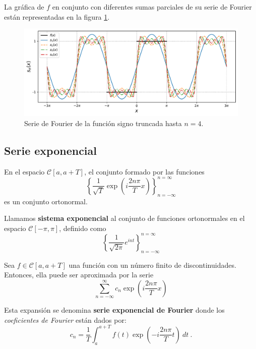 \begin{ejemplo}
La gráfica de $f$ en conjunto con diferentes sumas parciales de su serie de Fourier están representadas en la figura \ref{fig:EjemploFourier2}.

\begin{figure}[H]
    \centering
    \includegraphics[scale = 0.65]{Figuras/EjemploFourier2.pdf}
    \caption{Serie de Fourier de la función signo truncada hasta $n = 4$.}
     \label{fig:EjemploFourier2}
\end{figure}

\end{ejemplo}

\subsection{Serie exponencial}

\begin{propo}
    En el espacio $\mathscr{C}[a,a+T]$, el conjunto formado por las funciones 
    \begin{equation}
        \left\{ \frac{1}{\sqrt{T}} \exp\left(i\frac{2n\pi}{T}x\right) \right\}_{n= - \infty}^{n = \infty}
    \end{equation}
    es un conjunto ortonormal.
\end{propo}

\begin{defi} 
    Llamamos \textbf{sistema exponencial} al conjunto de funciones ortonormales en el espacio $\mathscr{C}[-\pi,\pi]$, definido como 
    $$\left\{ \frac{1}{\sqrt{2\pi}} e^{int} \right\}_{n= - \infty}^{n = \infty}$$
\end{defi}

\begin{defi} 
Sea $f \in \mathscr{C}[a,a+T]$ una función con un número finito de discontinuidades. Entonces, ella puede ser aproximada por la serie 
\begin{equation}
     \sum_{n=- \infty}^{\infty} c_n \exp\left(i\frac{2n\pi}{T}x\right) \label{FourierExpo}
\end{equation}

Esta expansión se denomina \textbf{serie exponencial de Fourier}  donde los \textit{coeficientes de Fourier} están dados por:
\begin{equation*}
    c_n = \frac{1}{T} \int_{a}^{a+T} f(t) \exp\left(-i\frac{2n\pi}{T}t \right) \ dt \ .
\end{equation*}
\end{defi}

